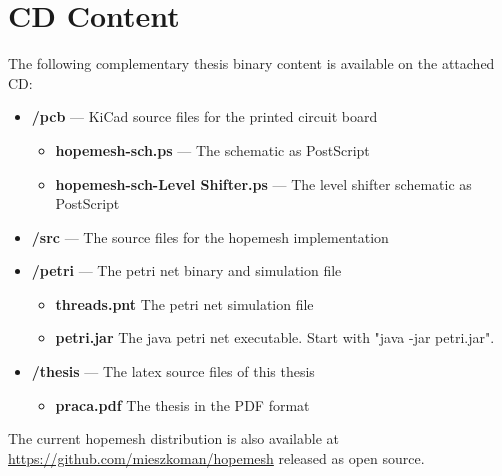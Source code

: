 \chapter{CD Content}
\label{cha:appendix_a}

The following complementary thesis binary content is available on the attached CD:

\begin{itemize}
    \item \textbf{/pcb} --- KiCad source files for the printed circuit board
        \begin{itemize}
            \item \textbf{hopemesh-sch.ps} --- The schematic as PostScript
            \item \textbf{hopemesh-sch-Level Shifter.ps} --- The level shifter schematic as PostScript
        \end{itemize}
    \item \textbf{/src} --- The source files for the hopemesh implementation
    \item \textbf{/petri} --- The petri net binary and simulation file
        \begin{itemize}
            \item \textbf{threads.pnt} The petri net simulation file
            \item \textbf{petri.jar} The java petri net executable. Start with "java -jar petri.jar".
        \end{itemize}
    \item \textbf{/thesis} --- The latex source files of this thesis
        \begin{itemize}
            \item \textbf{praca.pdf} The thesis in the PDF format
        \end{itemize}
\end{itemize}

The current hopemesh distribution is also available at \url{https://github.com/mieszkoman/hopemesh} released as open source.
